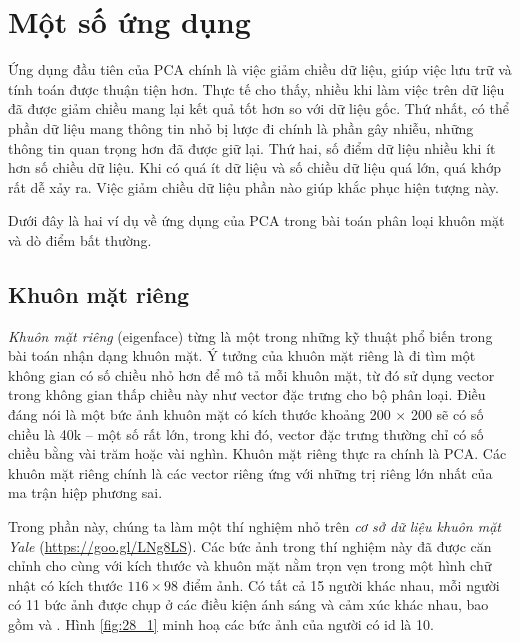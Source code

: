 

\section{Một số ứng dụng}
Ứng dụng đầu tiên của PCA chính là việc giảm chiều dữ liệu, giúp
việc lưu trữ và tính toán được thuận tiện hơn. Thực tế cho thấy, nhiều khi làm
việc trên dữ liệu đã được giảm chiều mang lại kết quả tốt hơn so với dữ liệu
gốc. Thứ nhất, có thể phần dữ liệu mang thông tin nhỏ bị lược đi chính là phần
gây nhiễu, những thông tin quan trọng hơn đã được giữ lại. Thứ hai, số điểm dữ
liệu nhiều khi ít hơn số chiều dữ liệu. Khi có quá ít dữ liệu và số chiều dữ
liệu quá lớn, quá khớp rất dễ xảy ra. Việc giảm chiều dữ liệu phần nào giúp
khắc phục hiện tượng này.

Dưới đây là hai ví dụ về ứng dụng của PCA trong bài toán phân loại khuôn mặt và dò điểm bất thường.

\subsection{Khuôn mặt riêng}
\textit{Khuôn mặt riêng} (eigenface) từng là một trong những kỹ thuật phổ biến
trong bài toán nhận dạng khuôn mặt. Ý tưởng của khuôn mặt riêng là đi tìm một
không gian có số chiều nhỏ hơn để mô tả mỗi khuôn mặt, từ đó sử dụng vector
trong không gian thấp chiều này như vector đặc trưng cho bộ phân loại. Điều đáng
nói là một bức ảnh khuôn mặt có kích thước khoảng 200 $\times$ 200 sẽ có số
chiều là 40k -- một số rất lớn, trong khi đó, vector đặc trưng thường chỉ có số
chiều bằng vài trăm hoặc vài nghìn. Khuôn mặt riêng thực ra chính là PCA. Các
khuôn mặt riêng chính là các vector riêng ứng với những trị riêng lớn nhất của
ma trận hiệp phương sai.

Trong phần này, chúng ta làm một thí nghiệm nhỏ trên \textit{cơ sở dữ liệu
khuôn mặt Yale} (\url{https://goo.gl/LNg8LS}). Các bức ảnh trong thí nghiệm
này đã được căn chỉnh cho cùng với kích thước và khuôn mặt nằm trọn vẹn trong
một hình chữ nhật có kích thước $116 \times  98$ điểm ảnh. Có tất cả 15 người khác
nhau, mỗi người có 11 bức ảnh được chụp ở các điều kiện ánh sáng và cảm xúc khác
nhau, bao gồm  và
. Hình \ref{fig:28_1} minh hoạ các bức ảnh của
người có id là 10.

